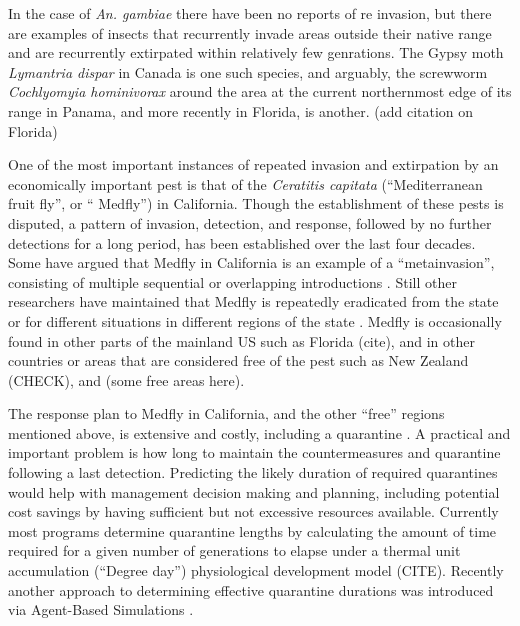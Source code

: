 \documentclass[10pt,a4paper,twocolumn]{article}
\begin{document}
In the case of \emph{An. gambiae} there have been no reports of
re invasion, but there are examples of insects that
recurrently invade areas outside their native range and are recurrently
extirpated within relatively few 
genrations. The Gypsy moth \emph{Lymantria dispar} in Canada
\citep{Gray2010Hitchhikers} is one such species, and arguably, the screwworm \emph{Cochlyomyia hominivorax}
around the area at the current northernmost edge of its range in Panama, and more recently in Florida,
\citep{Robinson2009Enabling} is another. (add citation on Florida)

One of the most important instances of repeated invasion and extirpation by an economically 
important pest is that of the \textit{Ceratitis capitata} (``Mediterranean fruit fly'', or `` Medfly'') 
in California.  
Though the establishment of these pests is disputed, a pattern of invasion, detection, and response, followed by no further detections for a long period, has been established over the last four decades. 
Some have argued that Medfly in California is an example of a ``metainvasion'', consisting of 
multiple sequential or
overlapping introductions \citep{Davies1999Bioinvasions}. Still other researchers have maintained 
that Medfly is repeatedly eradicated
from the state \citep{Haymer1997Genetic} or for different situations
in different regions of the state
\citep{Bonizzoni2001Microsatellite,Gasperi2002Genetic}. Medfly is occasionally found in 
other parts of the mainland US such as Florida (cite), and in other countries or areas that are considered 
free of the pest such as New Zealand (CHECK), and (some free areas here).

The response plan to Medfly in California, and the other ``free'' regions mentioned above, is extensive and 
 costly, including a quarantine \cite{Gilbert}. A practical and important problem 
is how long to maintain the countermeasures and quarantine following a last detection. 
Predicting the likely duration of required quarantines would help with
management decision making and planning,
including potential cost savings by having sufficient but not excessive
resources available. Currently most programs determine quarantine lengths by calculating the amount of
time required for a given number of generations to elapse under a thermal unit accumulation (``Degree day'')
physiological development model (CITE). Recently another approach to determining effective quarantine 
durations was introduced via Agent-Based Simulations \cite{Manoukis2014}. 
\end{document}
